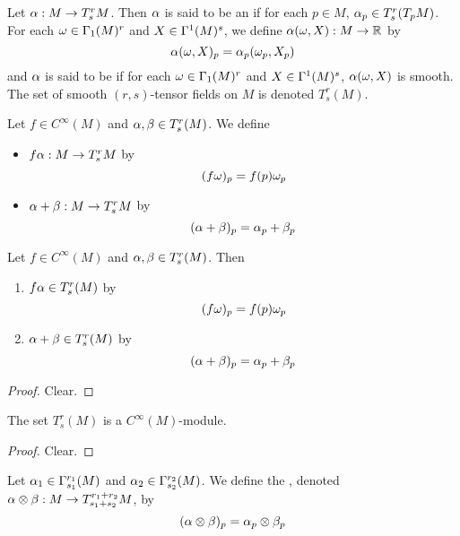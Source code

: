 \documentclass{book}
\begin{document}
	\begin{defn}
		Let $\alpha: M \rightarrow T^r_sM$. Then $\alpha$ is said to be an  if for each $p \in M$, $\alpha_p \in T^r_s(T_pM)$. \\
		For each $\omega \in \Gamma_1(M)^r$ and $X \in \Gamma^1(M)^s$, we define $\alpha(\omega, X) : M \rightarrow \mathbb{R}$ by $$\alpha(\omega, X)_p = \alpha_p(\omega_p, X_p)$$
		and $\alpha$ is said to be  if for each $\omega \in \Gamma_1(M)^r$ and $X \in \Gamma^1(M)^s$, $\alpha(\omega, X)$ is smooth. \\
		The set of smooth $(r,s)$-tensor fields on $M$ is denoted $T^r_s(M)$.\\
	\end{defn}

	\begin{defn}
	Let $f \in C^{\infty}(M)$ and $\alpha,\beta \in T^r_s(M)$. We define 
	\begin{itemize}
	\item $f\alpha: M \rightarrow T^r_sM$ by $$(f\omega)_p = f(p)\omega_p$$
	\item $\alpha+\beta:  M \rightarrow T^r_sM$ by $$(\alpha+\beta)_p = \alpha_p+\beta_p$$
	\end{itemize}
	\end{defn}
	
	\begin{ex}
	Let $f \in C^{\infty}(M)$ and $\alpha,\beta \in T^r_s(M)$. Then
	\begin{enumerate}
	\item $f\alpha \in T^r_s(M)$ by $$(f\omega)_p = f(p)\omega_p$$
	\item $\alpha+\beta \in T^r_s(M)$ by $$(\alpha+\beta)_p = \alpha_p+\beta_p$$
	\end{enumerate}
	\end{ex}
	
	\begin{proof}
	Clear.
	\end{proof}
	
	\begin{ex}
	The set $T^r_s(M)$ is a $C^{\infty}(M)$-module.
	\end{ex}
	
	\begin{proof}
	Clear.
	\end{proof}
	
	\begin{defn}
	Let $\alpha_1 \in \Gamma^{r_1}_{s_1}(M)$ and $\alpha_2 \in \Gamma^{r_2}_{s_2}(M)$. We define the , denoted $\alpha \otimes \beta : M \rightarrow T^{r_1 + r_2}_{s_1 + s_2}M$, by $$(\alpha \otimes \beta)_p = \alpha_p \otimes \beta_p$$
	\end{defn}
	
\end{document}
